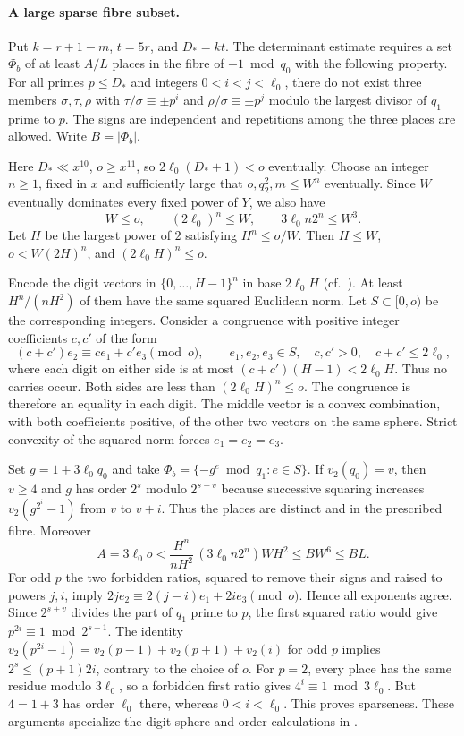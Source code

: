 \paragraph{A large sparse fibre subset.}
Put $k=r+1-m$, $t=5r$, and $D_*=kt$. The determinant estimate requires a set $\Phi_b$ of at least $A/L$ places in the fibre of $-1\bmod q_0$ with the following property. For all primes $p\le D_*$ and integers
$0<i<j<\ell_0$, there do not exist three members $\sigma,\tau,\rho$
with $\tau/\sigma\equiv\pm p^i$ and $\rho/\sigma\equiv\pm p^j$
modulo the largest divisor of $q_1$ prime to $p$. The signs are independent
and repetitions among the three places are allowed. Write $B=|\Phi_b|$.

Here $D_*\ll x^{10}$, $o\ge x^{11}$, so $2\ell_0(D_*+1)<o$ eventually.
Choose an integer $n\ge1$, fixed in $x$ and sufficiently large that
$o,q_2^2,m\le W^n$ eventually. Since $W$ eventually dominates every
fixed power of $Y$, we also have
\[
 W\le o,\qquad(2\ell_0)^n\le W,\qquad
 3\ell_0 n2^n\le W^3 .
\]
Let $H$ be the largest power of $2$ satisfying $H^n\le o/W$.
Then $H\le W$, $o<W(2H)^n$, and $(2\ell_0H)^n\le o$.

Encode the digit vectors in $\{0,\ldots,H-1\}^n$ in base $2\ell_0H$ (cf.~\cite{behrend}).
At least $H^n/(nH^2)$ of them have the same squared Euclidean norm.
Let $S\subset[0,o)$ be the corresponding integers. Consider a congruence with positive integer coefficients $c,c'$ of the form
\[
 (c+c')e_2\equiv ce_1+c'e_3\pmod o,\qquad
 e_1,e_2,e_3\in S,\quad c,c'>0,\quad c+c'\le2\ell_0 ,
\]
where each digit on either side is at most $(c+c')(H-1)<2\ell_0H$. Thus no carries occur. Both sides are less than $(2\ell_0H)^n\le o$. The congruence is therefore an equality in each digit. The middle vector is a convex combination, with both coefficients positive, of the other two vectors on the same sphere. Strict convexity of the squared norm forces $e_1=e_2=e_3$.

Set $g=1+3\ell_0q_0$ and take $\Phi_b=\{-g^e\bmod q_1:e\in S\}$.
If $v_2(q_0)=v$, then $v\ge4$ and $g$ has order $2^s$ modulo
$2^{s+v}$ because successive squaring increases $v_2(g^{2^i}-1)$ from $v$
to $v+i$. Thus the places are distinct and in the prescribed fibre. Moreover
\[
 A=3\ell_0o
 <\frac{H^n}{nH^2}\,(3\ell_0 n2^n)WH^2
 \le B W^6\le BL .
\]
For odd $p$ the two forbidden ratios, squared to remove their signs
and raised to powers $j,i$, imply
$2j e_2\equiv2(j-i)e_1+2i e_3\pmod o$.
Hence all exponents agree. Since $2^{s+v}$ divides the part of $q_1$ prime to $p$, the first squared ratio would give $p^{2i}\equiv1\bmod 2^{s+1}$.
The identity
$v_2(p^{2i}-1)=v_2(p-1)+v_2(p+1)+v_2(i)$ for odd $p$ implies
$2^s\le (p+1)2i$, contrary to the choice of $o$. For $p=2$, every place
has the same residue modulo $3\ell_0$, so a forbidden first ratio gives
$4^i\equiv1\bmod 3\ell_0$. But $4=1+3$ has order $\ell_0$ there,
whereas $0<i<\ell_0$. This proves sparseness. These arguments specialize
the digit-sphere and order calculations in
.

